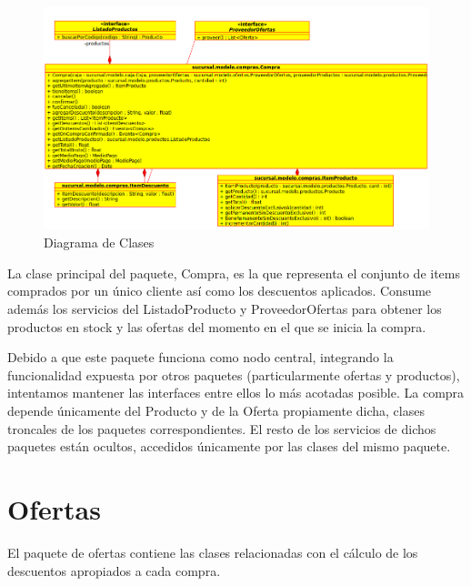 \documentclass[a4paper,11pt]{article}
\begin{document}
\begin{figure}[!htp]
\begin{center}
\includegraphics[width=1\textwidth]{src/docs/compras.png}
\end{center}
\caption{Diagrama de Clases} \label{fig:compra}
\end{figure}

\FloatBarrier

La clase principal del paquete, Compra, es la que representa el conjunto de
items comprados por un único cliente así como los descuentos aplicados. Consume
además los servicios del ListadoProducto y ProveedorOfertas para obtener los
productos en stock y las ofertas del momento en el que se inicia la compra.

Debido a que este paquete funciona como nodo central, integrando la
funcionalidad expuesta por otros paquetes (particularmente ofertas y
productos), intentamos mantener las interfaces entre ellos lo más acotadas
posible. La compra depende únicamente del Producto y de la Oferta propiamente
dicha, clases troncales de los paquetes correspondientes. El resto de los
servicios de dichos paquetes están ocultos, accedidos únicamente por las clases
del mismo paquete.

\section{Ofertas}

El paquete de ofertas contiene las clases relacionadas con el cálculo de los
descuentos apropiados a cada compra.
\end{document}
